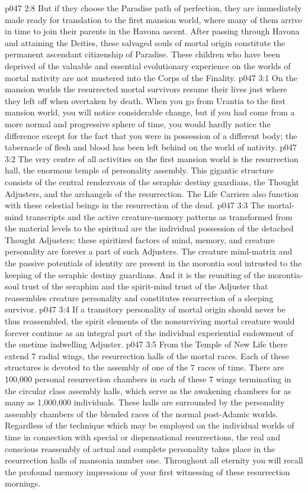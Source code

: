 \vs p047 2:8 But if they choose the Paradise path of perfection, they are immediately made ready for translation to the first mansion world, where many of them arrive in time to join their parents in the Havona ascent. After passing through Havona and attaining the Deities, these salvaged souls of mortal origin constitute the permanent ascendant citizenship of Paradise. These children who have been deprived of the valuable and essential evolutionary experience on the worlds of mortal nativity are not mustered into the Corps of the Finality.
\vs p047 3:1 On the mansion worlds the resurrected mortal survivors resume their lives just where they left off when overtaken by death. When you go from Urantia to the first mansion world, you will notice considerable change, but if you had come from a more normal and progressive sphere of time, you would hardly notice the difference except for the fact that you were in possession of a different body; the tabernacle of flesh and blood has been left behind on the world of nativity.
\vs p047 3:2 The very centre of all activities on the first mansion world is the resurrection hall, the enormous temple of personality assembly. This gigantic structure consists of the central rendezvous of the seraphic destiny guardians, the Thought Adjusters, and the archangels of the resurrection. The Life Carriers also function with these celestial beings in the resurrection of the dead.
\vs p047 3:3 The mortal\hyp{}mind transcripts and the active creature\hyp{}memory patterns as transformed from the material levels to the spiritual are the individual possession of the detached Thought Adjusters; these spiritized factors of mind, memory, and creature personality are forever a part of such Adjusters. The creature mind\hyp{}matrix and the passive potentials of identity are present in the morontia soul intrusted to the keeping of the seraphic destiny guardians. And it is the reuniting of the morontia\hyp{}soul trust of the seraphim and the spirit\hyp{}mind trust of the Adjuster that reassembles creature personality and constitutes resurrection of a sleeping survivor.
\vs p047 3:4 If a transitory personality of mortal origin should never be thus reassembled, the spirit elements of the nonsurviving mortal creature would forever continue as an integral part of the individual experiential endowment of the onetime indwelling Adjuster.
\vs p047 3:5 From the Temple of New Life there extend 7 radial wings, the resurrection halls of the mortal races. Each of these structures is devoted to the assembly of one of the 7 races of time. There are 100,000 personal resurrection chambers in each of these 7 wings terminating in the circular class assembly halls, which serve as the awakening chambers for as many as 1,000,000 individuals. These halls are surrounded by the personality assembly chambers of the blended races of the normal post\hyp{}Adamic worlds. Regardless of the technique which may be employed on the individual worlds of time in connection with special or dispensational resurrections, the real and conscious reassembly of actual and complete personality takes place in the resurrection halls of mansonia number one. Throughout all eternity you will recall the profound memory impressions of your first witnessing of these resurrection mornings.
